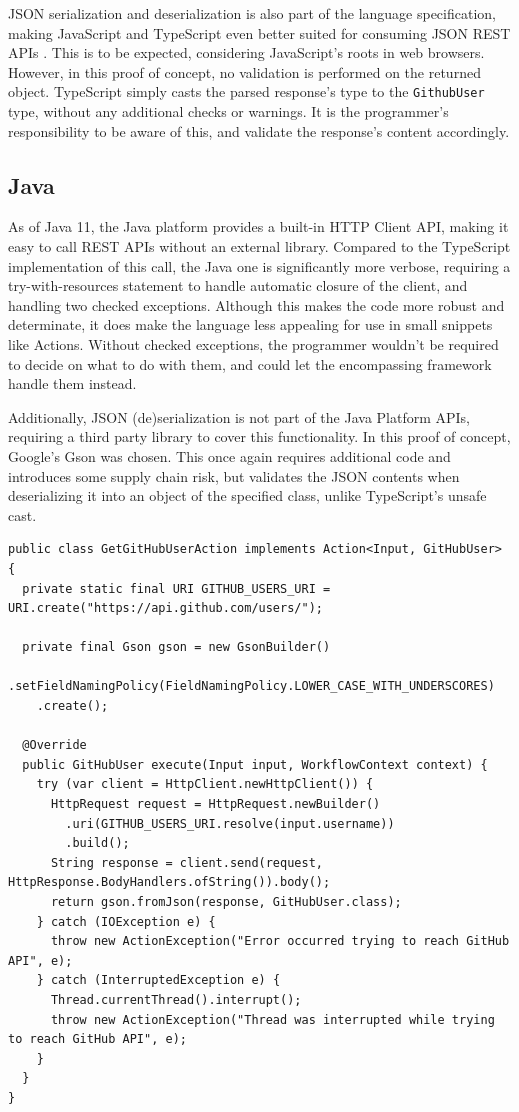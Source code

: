 JSON serialization and deserialization is also part of the language specification, making JavaScript and TypeScript even better suited for consuming JSON REST APIs \autocite{EcmaInternational2024}. This is to be expected, considering JavaScript's roots in web browsers. However, in this proof of concept, no validation is performed on the returned object. TypeScript simply casts the parsed response's type to the \texttt{GithubUser} type, without any additional checks or warnings. It is the programmer's responsibility to be aware of this, and validate the response's content accordingly.

\subsection{Java}
As of Java 11, the Java platform provides a built-in HTTP Client API, making it easy to call REST APIs without an external library. Compared to the TypeScript implementation of this call, the Java one is significantly more verbose, requiring a try-with-resources statement to handle automatic closure of the client, and handling two checked exceptions. Although this makes the code more robust and determinate, it does make the language less appealing for use in small snippets like Actions. Without checked exceptions, the programmer wouldn't be required to decide on what to do with them, and could let the encompassing framework handle them instead.

Additionally, JSON (de)serialization is not part of the Java Platform APIs, requiring a third party library to cover this functionality. In this proof of concept, Google's Gson was chosen. This once again requires additional code and introduces some supply chain risk, but validates the JSON contents when deserializing it into an object of the specified class, unlike TypeScript's unsafe cast.
\begin{listing}[H]
    \begin{verbatim}
public class GetGitHubUserAction implements Action<Input, GitHubUser> {
  private static final URI GITHUB_USERS_URI = URI.create("https://api.github.com/users/");
    
  private final Gson gson = new GsonBuilder()
    .setFieldNamingPolicy(FieldNamingPolicy.LOWER_CASE_WITH_UNDERSCORES)
    .create();
    
  @Override
  public GitHubUser execute(Input input, WorkflowContext context) {
    try (var client = HttpClient.newHttpClient()) {
      HttpRequest request = HttpRequest.newBuilder()
        .uri(GITHUB_USERS_URI.resolve(input.username))
        .build();
      String response = client.send(request, HttpResponse.BodyHandlers.ofString()).body();
      return gson.fromJson(response, GitHubUser.class);
    } catch (IOException e) {
      throw new ActionException("Error occurred trying to reach GitHub API", e);
    } catch (InterruptedException e) {
      Thread.currentThread().interrupt();
      throw new ActionException("Thread was interrupted while trying to reach GitHub API", e);
    }
  }
}
    \end{verbatim}
    \caption{REST API call in Java}
\end{listing}

